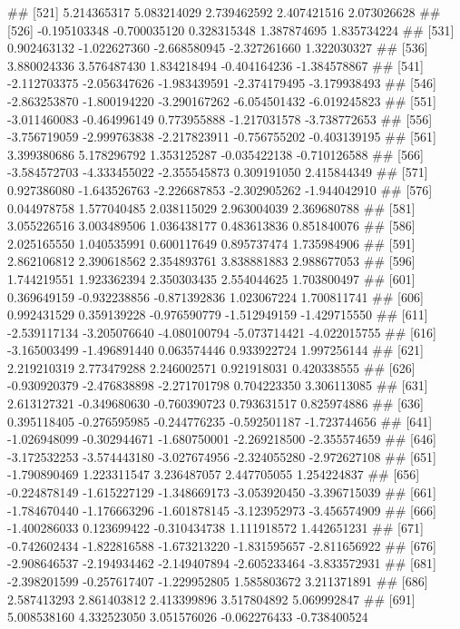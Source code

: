 \documentclass[
]{article}
\begin{document}
\begin{enumerate}[label=(\alph*)]
##  [521]  5.214365317  5.083214029  2.739462592  2.407421516  2.073026628
##  [526] -0.195103348 -0.700035120  0.328315348  1.387874695  1.835734224
##  [531]  0.902463132 -1.022627360 -2.668580945 -2.327261660  1.322030327
##  [536]  3.880024336  3.576487430  1.834218494 -0.404164236 -1.384578867
##  [541] -2.112703375 -2.056347626 -1.983439591 -2.374179495 -3.179938493
##  [546] -2.863253870 -1.800194220 -3.290167262 -6.054501432 -6.019245823
##  [551] -3.011460083 -0.464996149  0.773955888 -1.217031578 -3.738772653
##  [556] -3.756719059 -2.999763838 -2.217823911 -0.756755202 -0.403139195
##  [561]  3.399380686  5.178296792  1.353125287 -0.035422138 -0.710126588
##  [566] -3.584572703 -4.333455022 -2.355545873  0.309191050  2.415844349
##  [571]  0.927386080 -1.643526763 -2.226687853 -2.302905262 -1.944042910
##  [576]  0.044978758  1.577040485  2.038115029  2.963004039  2.369680788
##  [581]  3.055226516  3.003489506  1.036438177  0.483613836  0.851840076
##  [586]  2.025165550  1.040535991  0.600117649  0.895737474  1.735984906
##  [591]  2.862106812  2.390618562  2.354893761  3.838881883  2.988677053
##  [596]  1.744219551  1.923362394  2.350303435  2.554044625  1.703800497
##  [601]  0.369649159 -0.932238856 -0.871392836  1.023067224  1.700811741
##  [606]  0.992431529  0.359139228 -0.976590779 -1.512949159 -1.429715550
##  [611] -2.539117134 -3.205076640 -4.080100794 -5.073714421 -4.022015755
##  [616] -3.165003499 -1.496891440  0.063574446  0.933922724  1.997256144
##  [621]  2.219210319  2.773479288  2.246002571  0.921918031  0.420338555
##  [626] -0.930920379 -2.476838898 -2.271701798  0.704223350  3.306113085
##  [631]  2.613127321 -0.349680630 -0.760390723  0.793631517  0.825974886
##  [636]  0.395118405 -0.276595985 -0.244776235 -0.592501187 -1.723744656
##  [641] -1.026948099 -0.302944671 -1.680750001 -2.269218500 -2.355574659
##  [646] -3.172532253 -3.574443180 -3.027674956 -2.324055280 -2.972627108
##  [651] -1.790890469  1.223311547  3.236487057  2.447705055  1.254224837
##  [656] -0.224878149 -1.615227129 -1.348669173 -3.053920450 -3.396715039
##  [661] -1.784670440 -1.176663296 -1.601878145 -3.123952973 -3.456574909
##  [666] -1.400286033  0.123699422 -0.310434738  1.111918572  1.442651231
##  [671] -0.742602434 -1.822816588 -1.673213220 -1.831595657 -2.811656922
##  [676] -2.908646537 -2.194934462 -2.149407894 -2.605233464 -3.833572931
##  [681] -2.398201599 -0.257617407 -1.229952805  1.585803672  3.211371891
##  [686]  2.587413293  2.861403812  2.413399896  3.517804892  5.069992847
##  [691]  5.008538160  4.332523050  3.051576026 -0.062276433 -0.738400524

\end{enumerate}
\end{document}

